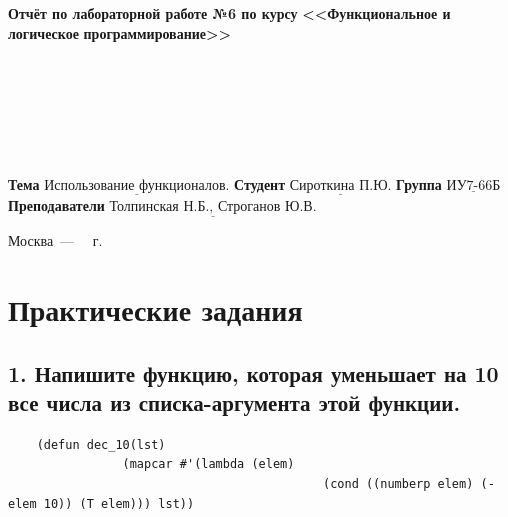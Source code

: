 \documentclass[12pt]{report}
\begin{document}
\begin{titlepage}
	
	\begin{center}
		\noindent\begin{minipage}{1.3\textwidth}\centering
			\Large\textbf{  Отчёт по лабораторной работе №6 по курсу}\newline\newline
			\textbf{<<Функциональное и логическое}\newline
			\textbf{\indent\indent\indent программирование>>}\newline
		\end{minipage}
	\end{center}
	
	~\\\\\\\\\\\\
	\large
	\noindent\textbf{Тема } $\underline{\text{Использование функционалов.}}$\newline\newline
	\noindent\textbf{Студент } $\underline{\text{Сироткина П.Ю.}}$\newline\newline
	\noindent\textbf{Группа } $\underline{\text{ИУ7-66Б}}$\newline\newline
	\noindent\textbf{Преподаватели } $\underline{\text{Толпинская Н.Б., Строганов Ю.В.}}$\newline\newline\newline
	
	\begin{center}
		\vfill
		Москва~---~\the\year
		~г.
	\end{center}
\end{titlepage}

\chapter*{Практические задания}

\section*{1. Напишите функцию, которая уменьшает на 10 все числа из списка-аргумента этой функции.}

\begin{lstlisting}
	(defun dec_10(lst) 
				(mapcar #'(lambda (elem) 
											(cond ((numberp elem) (- elem 10)) (T elem))) lst))
\end{lstlisting}
\end{document}
